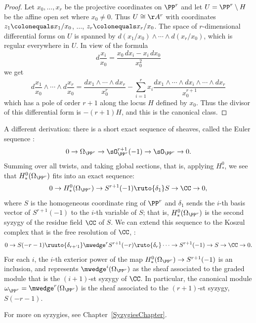 \begin{proof}
Let $x_{0}, \dots, x_{r}$ be the projective coordinates on $\PP^{r}$
and let  $U = \PP^{r}\setminus H$ be the affine open set where $x_{0}
\neq 0$. Thus $U \cong \AA^{r}$ with coordinates $z_{1} \colonequals
x_{1}/x_{0}$, $\dots$, $z_{r}\colonequals x_{r}/x_{0}$. The space of
$r$-dimensional differential forms on $U$ is spanned by
$d(x_{1}/x_{0})\wedge\cdots\wedge d(x_{r}/x_{0})$, which is regular
everywhere in $U$. In view of the formula
$$
d\frac{x_{i}}{x_{0}} = \frac{x_{0}\,dx_{i}-x_{i}\,dx_{0}}{x_{0}^{2}}
$$
we get
$$
d\frac{x_1}{x_0}\wedge\cdots\wedge 
d\frac{x_r}{x_0}
= \frac{dx_{1}\wedge\cdots\wedge dx_{r}}{x_{0}^{r}}-
\sum_{i=1}^{r} x_{i} \frac{ dx_{1}\wedge\cdots \wedge \widehat{dx_{i}}\wedge \cdots \wedge dx_{r}}{x_{0}^{r+1}}
$$
which has a pole of order $r+1$ along the locus $H$ defined by $x_{0}$. Thus the divisor of this differential form
is $-(r+1)H$, and this is the canonical class.
\end{proof}

\begin{fact}
A different derivation: there is a short exact sequence of sheaves,
%
called the Euler sequence \cite[Chapter II, \S8]{Hartshorne1977}:
$$
0\to \Omega_{\PP^{r}} \to \sO_{\PP^{r}}^{r+1} (-1) \to \sO_{\PP^{r}} \to 0.
$$
Summing over all twists, and taking global sections, that is, applying $H^0_*$, we see that 
$H^0_*(\Omega_{\PP^{r}})$ fits into an exact sequence:
$$
0 \to H^0_*(\Omega_{\PP^{r}}) \to S^{r+1}(-1) \ruto{\delta_{1}} S \to \CC \to 0,
$$
where $S$ is the homogeneous coordinate ring of $\PP^r$ and $\delta_1$ sends the $i$-th basis vector of
$S^{r+1}(-1)$ to the $i$-th variable of $S$; that is,
%
$H^0_*(\Omega_{\PP^{r}})$ is the second syzygy of the residue field
$\CC$ of $S$. We can extend this sequence to the Koszul complex that
is the free resolution
of $\CC$, 
%
\cite[\S17.5]{Eisenbud1995}:
$$
0 \to S(-r-1) \ruuto{\delta_{r+`1}} 
\mwedge^rS^{r+1}(-r) \ruto{\delta_{r}} \cdots \to S^{r+1}(-1) \to S \to \CC \to 0.
$$
For each $i$, the $i$-th exterior power of the map $H^0_*(\Omega_{\PP^{r}}) \to S^{r+1}(-1)$ is an inclusion, and
represents $\mwedge^i(\Omega_{\PP^{r}})$ as the sheaf associated to the graded module that is the $(i+1)$-st syzygy of $\CC$.
In particular, the canonical module $\omega^{}_{\PP^r} = \mwedge^r(\Omega_{\PP^{r}})$ is the sheaf associated to the 
$(r+1)$-st syzygy, $S(-r-1)$.

For more on syzygies, see Chapter~\ref{SyzygiesChapter}.
\end{fact}

